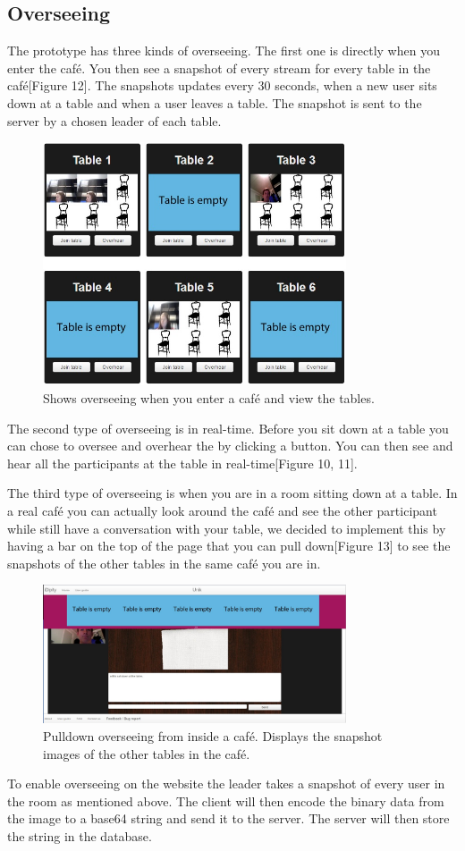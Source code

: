 \documentclass[12pt, titlepage]{article}
\begin{document}
\subsection{Overseeing}
The prototype has three kinds of overseeing. The first one is directly when you enter the café. You then see a snapshot of every stream for every table in the café[Figure 12]. The snapshots updates every 30 seconds, when a new user sits down at a table and when a user leaves a table. The snapshot is sent to the server by a chosen leader of each table.
\begin{figure}[H]
  \centering
	\includegraphics[width=0.8\textwidth,keepaspectratio]{overseeing2D.jpg}
  \caption{Shows overseeing when you enter a café and view the tables.}
\end{figure}
The second type of overseeing is in real-time. Before you sit down at a table you can chose to oversee and overhear the by clicking a button. You can then see and hear all the participants at the table in real-time[Figure 10, 11].

The third type of overseeing is when you are in a room sitting down at a table. In a real café you can actually look around the café and see the other participant while still have a conversation with your table, we decided to implement this by having a bar on the top of the page that you can pull down[Figure 13] to see the snapshots of the other tables in the same café you are in.
\begin{figure}[H]
  \centering
	\includegraphics[width=0.8\textwidth,keepaspectratio]{pulldownoversee.jpg}
  \caption{Pulldown overseeing from inside a café. Displays the snapshot images of the other tables in the café.}
\end{figure}
To enable overseeing on the website the leader takes a snapshot of every user in the room as mentioned above. The client will then encode the binary data from the image to a base64 string and send it to the server. The server will then store the string in the database.
\end{document}
